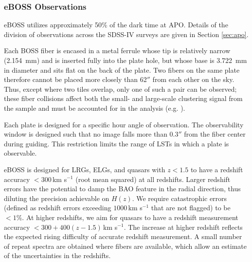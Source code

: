 \subsubsection{eBOSS Observations}
\label{sec:eboss:observations}

eBOSS utilizes approximately 50\% of the dark time at APO. Details of the
division of observations across the SDSS-IV surveys are given in
Section \ref{sec:apo}.

Each BOSS fiber is encased in a metal ferrule whose tip is relatively
narrow (2.154~mm) and is inserted fully into the plate hole, but whose
base is 3.722~mm in diameter and sits flat on the back of the plate.
Two fibers on the same plate therefore cannot be placed more closely
than 62$''$ from each other on the sky.  Thus, except where two tiles
overlap, only one of such a pair can be observed; these fiber
collisions affect both the small- and large-scale clustering signal
from the sample and must be accounted for in the analysis
(e.g. \citealt{guo12a}).

Each plate is designed for a specific hour angle of observation.  The
observability window is designed such that no image falls more than
0.3$''$ from the fiber center during guiding. This restriction limits
the range of LSTs in which a plate is observable.

eBOSS is designed for LRGs, ELGs, and quasars with $z<1.5$ to have a
redshift accuracy $<300$\,km s$^{-1}$ (root mean squared) at all
redshifts. Larger redshift errors have the potential to damp the BAO
feature in the radial direction, thus diluting the precision
achievable on $H(z)$. We require catastrophic errors (defined as
redshift errors exceeding $1000$\,km s$^{-1}$ that are not flagged) to
be $<1\%$. At higher redshifts, we aim for quasars to have a redshift
measurement accuracy $< 300 + 400(z - 1.5)$\,km s$^{-1}$. The increase
at higher redshift reflects the expected rising difficulty of accurate
redshift measurement. A small number of repeat spectra are obtained
where fibers are available, which allow an estimate of the
uncertainties in the redshifts.

